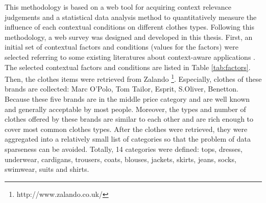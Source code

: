 This methodology is based on a web tool for acquiring context relevance judgements and a statistical data analysis method to quantitatively measure the influence of each contextual conditions on different clothes types. Following this methodology, a web survey was designed and developed in this thesis. First, an initial set of contextual factors and conditions (values for the factors) were selected referring to some existing literatures about context-aware applications \cite{ref:5, ref:12, ref:19}. The selected contextual factors and conditions are listed in Table \ref{tab:factors}. Then, the clothes items were retrieved from Zalando \footnote{http://www.zalando.co.uk/}. Especially, clothes of these brands are collected: Marc O'Polo, Tom Tailor, Esprit, S.Oliver, Benetton. Because these five brands are in the middle price category and are well known and generally acceptable by most people. Moreover, the types and number of clothes offered by these brands are similar to each other and are rich enough to cover most common clothes types. After the clothes were retrieved, they were aggregated into a relatively small list of categories so that the problem of data sparseness can be avoided. Totally, 14 categories were defined: tops, dresses, underwear, cardigans, trousers, coats, blouses, jackets, skirts, jeans, socks, swimwear, suits and shirts.

